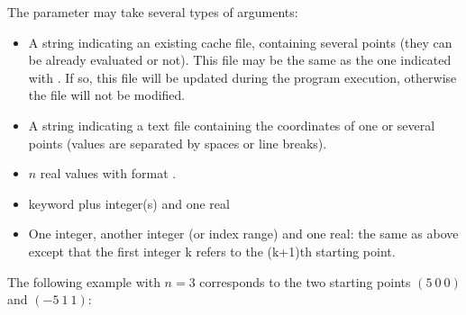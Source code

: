 \documentclass[letterpaper,10pt,english]{sphinxmanual}
\begin{document}
\sphinxAtStartPar
The  parameter may take several types of arguments:
\begin{itemize}
\item {} 
\sphinxAtStartPar
A string indicating an existing cache file, containing several points (they can be already evaluated or not). This file may be the same as the one indicated with . If so, this file will be updated during the program execution, otherwise the file will not be modified.

\item {} 
\sphinxAtStartPar
A string indicating a text file containing the coordinates of one or several points (values are separated by spaces or line breaks).

\item {} 
\sphinxAtStartPar
\(n\) real values with format .

\item {} 
\sphinxAtStartPar
{} keyword plus integer(s) and one real

\end{itemize}

\begin{sphinxVerbatim}[commandchars=\\\{\}]
       
         
       
\end{sphinxVerbatim}
\begin{itemize}
\item {} 
\sphinxAtStartPar
One integer, another integer (or index range) and one real: the same as above except that the first integer k refers to the (k+1)th starting point.

\end{itemize}

\sphinxAtStartPar
The following example with \(n=3\) corresponds to the two starting points \(( 5~0~0)\) and \((-5~1~1)\):

\begin{sphinxVerbatim}[commandchars=\\\{\}]
  
  
   
   
\end{sphinxVerbatim}
\end{document}

